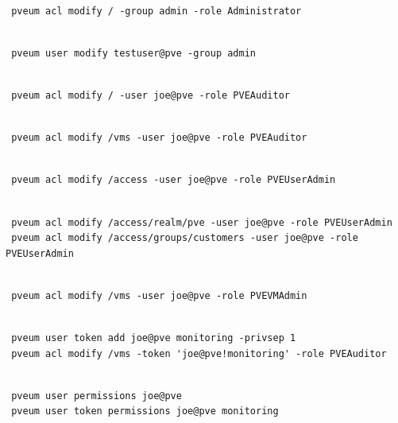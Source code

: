\begin{lstlisting}

 pveum acl modify / -group admin -role Administrator

\end{lstlisting}

\begin{lstlisting}

 pveum user modify testuser@pve -group admin

\end{lstlisting}

\begin{lstlisting}

 pveum acl modify / -user joe@pve -role PVEAuditor

\end{lstlisting}

\begin{lstlisting}

 pveum acl modify /vms -user joe@pve -role PVEAuditor

\end{lstlisting}

\begin{lstlisting}

 pveum acl modify /access -user joe@pve -role PVEUserAdmin

\end{lstlisting}

\begin{lstlisting}

 pveum acl modify /access/realm/pve -user joe@pve -role PVEUserAdmin
 pveum acl modify /access/groups/customers -user joe@pve -role PVEUserAdmin

\end{lstlisting}

\begin{lstlisting}

 pveum acl modify /vms -user joe@pve -role PVEVMAdmin

\end{lstlisting}

\begin{lstlisting}

 pveum user token add joe@pve monitoring -privsep 1
 pveum acl modify /vms -token 'joe@pve!monitoring' -role PVEAuditor

\end{lstlisting}

\begin{lstlisting}

 pveum user permissions joe@pve
 pveum user token permissions joe@pve monitoring

\end{lstlisting}

